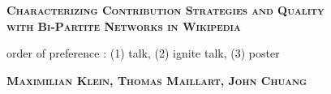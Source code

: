 \documentclass[letterpaper,9pt,a4paper]{article}
\begin{document}
\begin{center}






  

\vspace{-1cm}
{\large {\bf \textsc{Characterizing Contribution Strategies and Quality \\ with Bi-Partite Networks in Wikipedia\\}}}
\begin{center}
\vspace{-0.cm}
\footnotesize{order of preference : (1) talk, (2) ignite talk, (3) poster}
\end{center}
\vspace{-0.cm}
{ {\bf \textsc{Maximilian Klein, Thomas Maillart, John Chuang}}}
\vspace{0.2cm}
\end{center}
\end{document}
